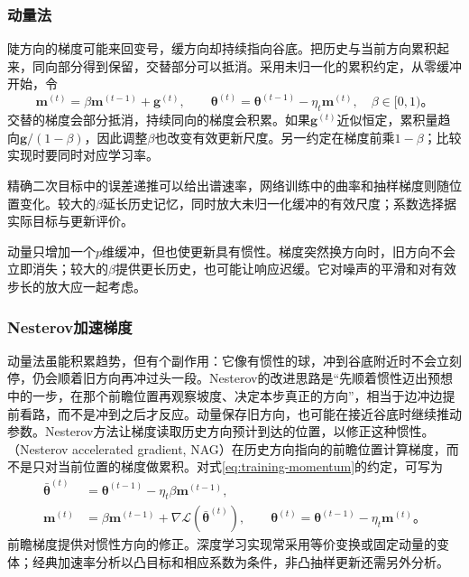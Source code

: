 \subsubsection{动量法}
\label{sec:training-momentum}

陡方向的梯度可能来回变号，缓方向却持续指向谷底。把历史与当前方向累积起来，同向部分得到保留，交替部分可以抵消。采用未归一化的累积约定，从零缓冲开始，令
\begin{equation}
  \bm m^{(t)}=\beta\bm m^{(t-1)}+\bm g^{(t)},\qquad
  \bm\theta^{(t)}=\bm\theta^{(t-1)}-\eta_t\bm m^{(t)},
  \quad\beta\in[0,1)\text{。}
  \label{eq:training-momentum}
\end{equation}
交替的梯度会部分抵消，持续同向的梯度会积累。如果$\bm g^{(t)}$近似恒定，累积量趋向$\bm g/(1-\beta)$，因此调整$\beta$也改变有效更新尺度。另一约定在梯度前乘$1-\beta$；比较实现时要同时对应学习率。

精确二次目标中的误差递推可以给出谱速率，网络训练中的曲率和抽样梯度则随位置变化。较大的$\beta$延长历史记忆，同时放大未归一化缓冲的有效尺度；系数选择据实际目标与更新评价。

动量只增加一个$p$维缓冲，但也使更新具有惯性。梯度突然换方向时，旧方向不会立即消失；较大的$\beta$提供更长历史，也可能让响应迟缓。它对噪声的平滑和对有效步长的放大应一起考虑。

\subsubsection{Nesterov加速梯度}
\label{sec:training-nesterov}

动量法虽能积累趋势，但有个副作用：它像有惯性的球，冲到谷底附近时不会立刻停，仍会顺着旧方向再冲过头一段。Nesterov的改进思路是“先顺着惯性迈出预想中的一步，在那个前瞻位置再观察坡度、决定本步真正的方向”，相当于边冲边提前看路，而不是冲到之后才反应。动量保存旧方向，也可能在接近谷底时继续推动参数。Nesterov方法让梯度读取历史方向预计到达的位置，以修正这种惯性。（Nesterov accelerated gradient, NAG）在历史方向指向的前瞻位置计算梯度，而不是只对当前位置的梯度做累积。对式\eqref{eq:training-momentum}的约定，可写为
\begin{align}
  \bar{\bm\theta}^{(t)}&=\bm\theta^{(t-1)}-\eta_t\beta\bm m^{(t-1)},\\
  \bm m^{(t)}&=\beta\bm m^{(t-1)}+
       \nabla\mathcal L(\bar{\bm\theta}^{(t)}),\qquad
  \bm\theta^{(t)}=\bm\theta^{(t-1)}-\eta_t\bm m^{(t)}\text{。}
  \label{eq:training-nesterov}
\end{align}
前瞻梯度提供对惯性方向的修正。深度学习实现常采用等价变换或固定动量的变体；经典加速率分析以凸目标和相应系数为条件，非凸抽样更新还需另外分析。

